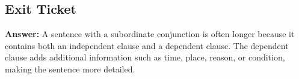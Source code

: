 \documentclass[12pt]{article}
\begin{document}
\subsection*{Exit Ticket}
\textbf{Answer:}  
A sentence with a subordinate conjunction is often longer because it contains both an independent clause and a dependent clause. The dependent clause adds additional information such as time, place, reason, or condition, making the sentence more detailed.
\end{document}
